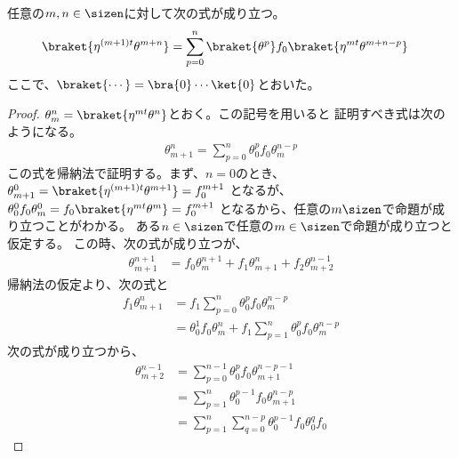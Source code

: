 	\begin{proposition}[Brzozowski代数による漸化式]
	\label{prop:Brzozowski代数による漸化式} %
		任意の$m,n\in\sizen$に対して次の式が成り立つ。
		\begin{equation*}\begin{split} %
			\braket{\eta^{(m+1)t}\theta^{m+n}}
			&= \sum_{p=0}^n\braket{\theta^p}f_0\braket{\eta^{mt}\theta^{m+n-p}}
		\end{split}\end{equation*} %
		ここで、$\braket{\cdots}=\bra{0}\cdots\ket{0}$とおいた。
	\end{proposition} %
	\begin{proof} %
		$\theta_m^n=\braket{\eta^{mt}\theta^n}$とおく。この記号を用いると
		証明すべき式は次のようになる。
		\begin{equation*}\begin{split} %
			\theta_{m+1}^n = \sum_{p=0}^n\theta_0^pf_0\theta_m^{n-p}
		\end{split}\end{equation*} %
		この式を帰納法で証明する。まず、$n=0$のとき、
		$\theta_{m+1}^0=\braket{\eta^{(m+1)t}\theta^{m+1}}=f_0^{m+1}$
		となるが、
		$\theta_0^0f_0\theta_m^0=f_0\braket{\eta^{mt}\theta^m}=f_0^{m+1}$
		となるから、任意の$m\sizen$で命題が成り立つことがわかる。
		ある$n\in\sizen$で任意の$m\in\sizen$で命題が成り立つと仮定する。
		この時、次の式が成り立つが、
		\begin{equation*}\begin{split} %
			\theta_{m+1}^{n+1}
			&= f_0\theta_m^{n+1} + f_1\theta_{m+1}^n + f_2\theta_{m+2}^{n-1}
		\end{split}\end{equation*} %
		帰納法の仮定より、次の式と
		\begin{equation*}\begin{split} %
			f_1\theta_{m+1}^n &= f_1\sum_{p=0}^n\theta_0^pf_0\theta_m^{n-p} \\
			&= \theta_0^1f_0\theta_m^n 
				+ f_1\sum_{p=1}^n\theta_0^pf_0\theta_m^{n-p}
		\end{split}\end{equation*} %
		次の式が成り立つから、
		\begin{equation*}\begin{split} %
			\theta_{m+2}^{n-1} 
			&= \sum_{p=0}^{n-1}\theta_0^pf_0\theta_{m+1}^{n-p-1} \\
			&= \sum_{p=1}^n\theta_0^{p-1}f_0\theta_{m+1}^{n-p} \\
			&= \sum_{p=1}^n\sum_{q=0}^{n-p}\theta_0^{p-1}f_0\theta_0^qf_0

\end{split}
\end{equation*}
\end{proof}
